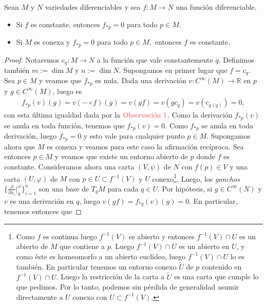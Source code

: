 \documentclass[11pt]{article}
\newcommand{\R}{\mathbb{R}}
\newcommand{\paint}[2]{\color{#1}{#2}}
\newcommand{\hook}[3]{\frac{\partial}{\partial x_{#1}}\Big\rvert_{#2}^{#3}}
\newenvironment{exercise}[2][Ejercicio]{\begin{trivlist}
\item[\hskip \labelsep \paint{red}{{\bfseries #1}}\hskip \labelsep {\bfseries #2.}]}{\end{trivlist}}
\begin{document}
\begin{exercise}{12} Sean $M$ y $N$ variedades diferenciables y sea $f:M\to N$ una funci\'on
diferenciable.
\begin{itemize}
\item Si $f$ es constante, entonces $f_{\ast p}=0$ para todo $p\in M$.

\item Si $M$ es conexa y $f_{\ast p}=0$ para todo $p\in M,$ entonces $f$ es
constante.
\end{itemize}
\end{exercise}

\begin{proof} Notaremos $c_q : M \to N$ a la funci\'on que vale constantemente $q$. Definimos tambi\'en $m := \dim M$ y $n := \dim N$. Supongamos en primer lugar que $f = c_q$. Sea $p \in M$ y veamos que $f_{\ast p}$ es nula. Dada una derivaci\'on $v : C^\infty(M) \to \R$ en $p$ y $g \in C^\infty(M)$, luego es
\begin{align*}
f_{\ast p}(v)(g) =  v(- \circ f)(g) = v(gf) = v(gc_q) = v(c_{g(q)}) = 0,
\end{align*}
con esta \'ultima igualdad dada por la $\paint{red}{\text{Observaci\'on $1$}}$. Como la derivaci\'on $f_{\ast p}(v)$ se anula en toda funci\'on, tenemos que $f_{\ast p}(v) = 0$. Como $f_{\ast p}$ se anula en toda derivaci\'on, luego $f_{\ast p} = 0$ y esto vale para cualquier punto $p \in M$. Supongamos ahora que $M$ es conexa y veamos para este caso la afirmaci\'on rec\'iproca. Sea entonces $p \in M$ y veamos que existe un entorno abierto de $p$ donde $f$ es constante. Consideramos ahora una carta $(V,\psi)$ de $N$ con $f(p) \in V$ y una carta $(U,\varphi)$ de $M$ con $p \in U \subset f^{-1}(V)$ y $U$ conexo\footnote{Como $f$ es continua luego $f^{-1}(V)$ es abierto y entonces $f^{-1}(V) \cap U$ es un abierto de $M$ que contiene a $p$. Luego $f^{-1}(V) \cap U$ es un abierto en $U$, y como \'este es homeomorfo a un abierto eucl\'ideo, luego $f^{-1}(V) \cap U$ lo es tambi\'en. En particular tenemos un entorno conexo $\tilde{U}$ de $p$ contenido en $f^{-1}(V) \cap U$. Luego la restricci\'on de la carta a $\tilde{U}$ es una carta que cumple lo que pedimos. Por lo tanto, podemos sin p\'erdida de generalidad asumir directamente a $U$ conexo con $U \subset f^{-1}(V)$.}. Luego, los \textit{ganchos} $\bigg\{\hook{i}{q}{\varphi}\bigg\}_{i=1}^n$ son una base de $T_qM$ para cada $q \in U$. Por hip\'otesis, si $g \in C^\infty(N)$ y $v$ es una derivaci\'on en $q$, luego $v(gf) = f_{\ast q}(v)(g) = 0$. En particular, tenemos entonces que

\end{proof}
\end{document}
